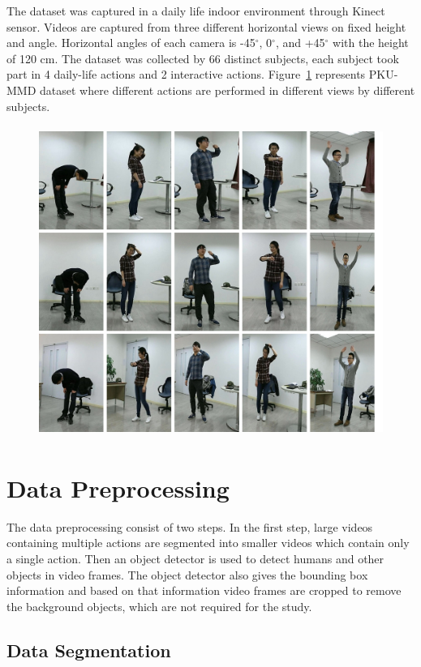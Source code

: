The dataset was captured in a daily life indoor environment through Kinect sensor. Videos are captured from three different horizontal views on fixed height and angle. Horizontal angles of each camera is -45$^{\circ}$, 0$^{\circ}$, and +45$^{\circ}$ with the height of 120 \si{cm}.
The dataset was collected by 66 distinct subjects, each subject took part in 4 daily-life actions and 2 interactive actions. Figure~\ref{fig1:PKUMMD} represents PKU-MMD dataset where different actions are performed in different views by different subjects.
\begin{figure}[!ht]
	
	\includegraphics[width=6in,height=4in]{figures/PKUMMD-NEW1}
	\linebreak
	\label{fig1:PKUMMD}
\end{figure}
\section{Data Preprocessing} 
The data preprocessing consist of two steps. In the first step, large videos containing multiple actions are segmented into smaller videos which contain only a single action. Then an object detector is used to detect humans and other objects in video frames. The object detector also gives the bounding box information and based on that information video frames are cropped to remove the background objects, which are not required for the study.
\subsection{Data Segmentation}


